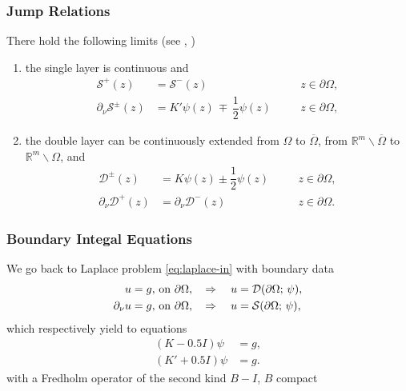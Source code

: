 \documentclass[handout]{beamer}
\begin{document}
\begin{frame}
 \frametitle{Jump Relations}
 There hold the following limits (see \cite{kress:book}, \cite{salsa:book})
  \begin{enumerate}
  \item the single layer is continuous and 
  \begin{subequations}
  \begin{align}
   \mathcal{S}^+(z)&=\mathcal{S}^-(z)&&\quad z\in\partial \Omega,\label{eq:single-pm-0}\\
   \partial_\nu\mathcal{S}^\pm(z) &
   =  K'\psi(z) \,\mp\,\dfrac{1}{2}\psi(z) &&\quad z\in\partial \Omega,\label{eq:single-pm-1}
  \end{align}
 \end{subequations}
 \item the double layer can be continuously extended from $\Omega$ to $\overline{\Omega}$, from $\mathbb{R}^m\backslash \overline{\Omega}$ to $\mathbb{R}^m\backslash \Omega$, and
  \begin{subequations}
  \begin{align}
   \mathcal{D}^\pm(z) &= K\psi(z) \pm\dfrac{1}{2}\psi(z)\quad&& z\in\partial \Omega, \label{eq:double-pm-0}\\
   \partial_\nu\mathcal{D}^+(z) &= \partial_\nu\mathcal{D}^-(z) \quad &&z\in\partial \Omega. \label{eq:double-pm-1}
  \end{align}
  \end{subequations}
 \end{enumerate}
\end{frame}
\begin{frame}
 \frametitle{Boundary Integal Equations}
 We go back to Laplace problem \eqref{eq:laplace-in} with boundary data
\begin{align}
  u = g, & \textup{ on }\partial\Omega, \quad \Rightarrow \quad u = \mathcal{D}(\partial\Omega;\, \psi), \label{eq:bc-lap-dir}\\
  \partial_\nu u = g, & \textup{ on }\partial\Omega, \quad \Rightarrow \quad u = \mathcal{S}(\partial\Omega;\, \psi), \label{eq:bc-lap-neum}
\end{align}
\pause
which respectively yield to equations
\begin{align}
 (K - 0.5 I)\psi &= g,\label{eq:bie-dir}\\
 (K' + 0.5 I)\psi &= g.\label{eq:bie-neum}
\end{align}
with a Fredholm operator of the second kind {\color{blue}$B - I$}, $B$ compact
\end{frame}
\end{document}
